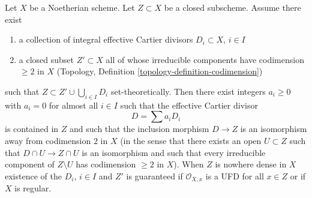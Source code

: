 \begin{lemma}
\label{lemma-codim-1-part}
Let $X$ be a Noetherian scheme. Let $Z \subset X$ be a closed subscheme.
Assume there exist
\begin{enumerate}
\item a collection of integral effective Cartier divisors
$D_i \subset X$, $i \in I$
\item a closed subset $Z' \subset X$ all of whose irreducible components
have codimension $\geq 2$ in $X$
(Topology, Definition \ref{topology-definition-codimension})
\end{enumerate}
such that $Z \subset Z' \cup \bigcup_{i \in I} D_i$ set-theoretically.
Then there exist integers $a_i \geq 0$ with $a_i = 0$ for almost all $i \in I$
such that the effective Cartier divisor
$$
D = \sum a_i D_i
$$
is contained in $Z$ and such that the inclusion morphism $D \to Z$
is an isomorphism away from codimension $2$ in $X$
(in the sense that there exists an open $U \subset Z$ such that
$D \cap U \to Z \cap U$ is an isomorphism and such that every
irreducible component of $Z \setminus U$ has codimension $\geq 2$ in $X$).
When $Z$ is nowhere dense in $X$ existence of the $D_i$, $i \in I$ and $Z'$
is guaranteed if $\mathcal{O}_{X, x}$ is a UFD for all $x \in Z$
or if $X$ is regular.
\end{lemma}

